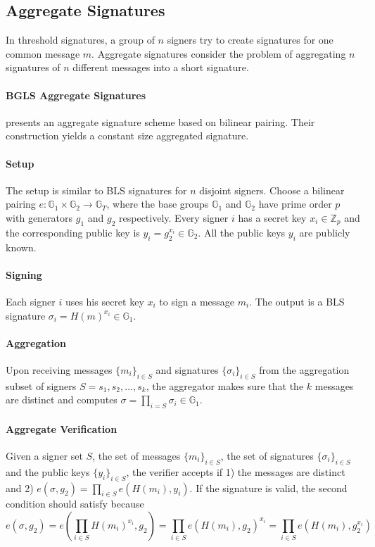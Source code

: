 \subsection{Aggregate Signatures} \label{subsec:aggregate}
In threshold signatures, a group of $n$ signers try to create signatures for one common message $m$. Aggregate signatures consider the problem of aggregating $n$ signatures of $n$ different messages into a short signature. 

\paragraph{BGLS Aggregate Signatures} \cite{DBLP:conf/eurocrypt/BonehGLS03} presents an aggregate signature scheme based on bilinear pairing. Their construction yields a constant size aggregated signature. 

\paragraph{Setup} The setup is similar to BLS signatures for $n$ disjoint signers. Choose a bilinear pairing $e:\mathbb{G}_1\times \mathbb{G}_2\to \mathbb{G}_T$, where the base groups $\mathbb{G}_1$ and $\mathbb{G}_2$ have prime order $p$ with generators $g_1$ and $g_2$ respectively. Every signer $i$ has a secret key $x_i\in \mathbb{Z}_p$ and the corresponding public key is $y_i = g_2^{x_i}\in \mathbb{G}_2$. All the public keys $y_i$ are publicly known. 

\paragraph{Signing} Each signer $i$ uses his secret key $x_i$ to sign a message $m_i$. The output is a BLS signature $\sigma_i = H(m)^{x_i}\in \mathbb{G}_1$.  

\paragraph{Aggregation} Upon receiving messages $\{m_i\}_{i\in S}$ and signatures $\{\sigma_i\}_{i\in S}$ from the aggregation subset of signers $S={s_1, s_2,\dots, s_k}$, the aggregator makes sure that the $k$ messages are distinct and computes $\sigma=\prod_{i=S} \sigma_i \in \mathbb{G}_1$. 

\paragraph{Aggregate Verification} Given a signer set $S$, the set of messages $\{m_i\}_{i\in S}$, the set of signatures $\{\sigma_i\}_{i\in S}$ and the public keys $\{y_i\}_{i\in S}$, the verifier accepts if 1) the messages are distinct and 2) $e(\sigma, g_2)=\prod_{i\in S}e(H(m_i), y_i)$. If the signature is valid, the second condition should satisfy because 
\begin{equation*}
    e(\sigma, g_2) = e(\prod_{i\in S}H(m_i)^{x_i}, g_2) = \prod_{i\in S} e(H(m_i), g_2)^{x_i} = \prod_{i\in S}e(H(m_i), g_2^{x_i}) %
\end{equation*}

